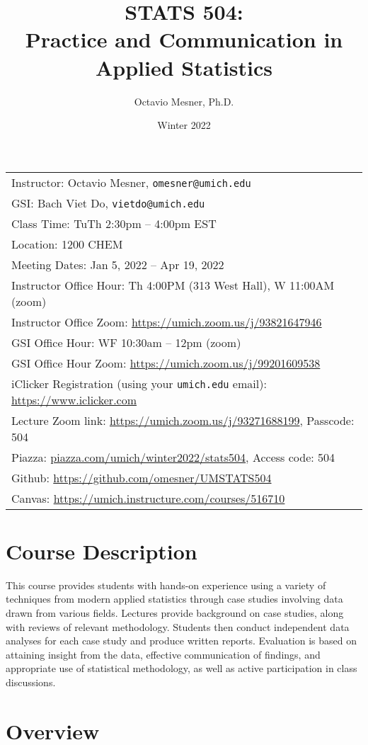 \documentclass[11pt]{article}
\title{STATS 504: \\ Practice and Communication in Applied Statistics}
\author{Octavio Mesner, Ph.D.}
\date{Winter 2022}
\begin{document}
\maketitle
\begin{tabular}{l}
Instructor: Octavio Mesner, \texttt{omesner@umich.edu} \\
GSI: Bach Viet Do, \texttt{vietdo@umich.edu} \\
Class Time: TuTh 2:30pm -- 4:00pm EST \\
Location: 1200 CHEM \\
Meeting Dates: Jan 5, 2022 -- Apr 19, 2022\\
Instructor Office Hour: Th 4:00PM (313 West Hall), W 11:00AM (zoom) \\
Instructor Office Zoom: \url{https://umich.zoom.us/j/93821647946} \\
GSI Office Hour: WF 10:30am -- 12pm (zoom) \\
GSI Office Hour Zoom: \url{https://umich.zoom.us/j/99201609538} \\
iClicker Registration (using your \texttt{umich.edu} email): \url{https://www.iclicker.com} \\
Lecture Zoom link: \url{https://umich.zoom.us/j/93271688199}, Passcode: 504 \\
Piazza: \url{piazza.com/umich/winter2022/stats504}, Access code: 504 \\
Github: \url{https://github.com/omesner/UMSTATS504} \\
Canvas: \url{https://umich.instructure.com/courses/516710}
\end{tabular}

\section*{Course Description}

This course provides students with hands-on experience using a variety of techniques from modern applied statistics through case studies involving data drawn from various fields.
Lectures  provide background on case studies, along with reviews of relevant methodology.
Students then conduct independent data analyses for each case study and produce written reports.
Evaluation is based on attaining insight from the data, effective communication of findings, and appropriate use of statistical methodology, as well as active participation in class discussions.

\section*{Overview}
\end{document}
